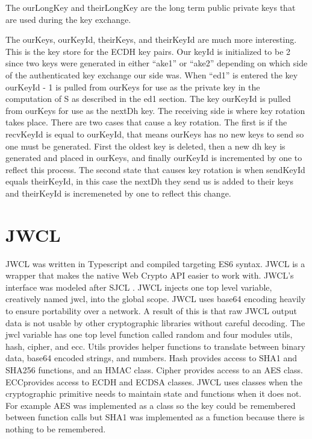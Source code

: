 The ourLongKey and theirLongKey are the long term public private keys that are used during the key exchange. 


The ourKeys, ourKeyId, theirKeys, and theirKeyId are much more interesting. This is the key store for the ECDH key pairs. Our keyId is initialized to be 2 since two keys were generated in either “ake1” or “ake2” depending on which side of the authenticated key exchange our side was. When “ed1” is entered the key ourKeyId - 1 is pulled from ourKeys for use as the private key in the computation of S as described in the ed1 section. The key ourKeyId is pulled from ourKeys for use as the nextDh key. The receiving side is where key rotation takes place. There are two cases that cause a key rotation. The first is if the recvKeyId is equal to ourKeyId, that means ourKeys has no new keys to send so one must be generated. First the oldest key is deleted, then a new dh key is generated and placed in ourKeys, and finally ourKeyId is incremented by one to reflect this process. The second state that causes key rotation is when sendKeyId equals theirKeyId, in this case the nextDh they send us is added to their keys and theirKeyId is incremeneted by one to reflect this change.


\section{JWCL}


JWCL was written in Typescript and compiled targeting ES6 syntax. JWCL is a wrapper that makes the native Web Crypto API easier to work with. JWCL’s interface was modeled after SJCL \cite{sjcl-library}. JWCL injects one top level variable, creatively named jwcl, into the global scope. JWCL uses base64 encoding heavily to ensure portability over a network. A result of this is  that raw JWCL output data is not usable by other cryptographic libraries without careful decoding. The jwcl variable has one top level function called random and four modules utils, hash, cipher, and ecc. Utils provides helper functions to translate between binary data, base64 encoded strings, and numbers. Hash provides access to SHA1 and SHA256 functions, and an HMAC class. Cipher provides access to an AES class. ECCprovides access to ECDH and ECDSA classes. JWCL uses classes when the cryptographic primitive needs to maintain state and functions when it does not. For example AES was implemented as a class so the key could be remembered between function calls but SHA1 was implemented as a function because there is nothing to be remembered. 


